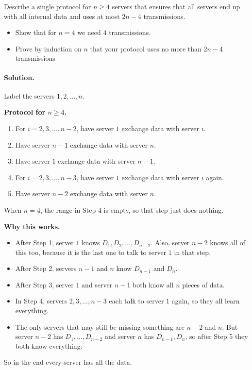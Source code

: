 \documentclass[10pt]{article}
\begin{document}
Describe a single protocol for $n\geq 4$ servers that ensures that all servers end up with all internal data and uses at most $2n-4$ transmissions.






\begin{itemize}
\item Show that for $n=4$ we need $4$ transmissions. 
\item Prove by induction on $n$ that your protocol uses no more than $2n-4$ transmissions


\end{itemize}

\paragraph{Solution.} Label the servers $1,2,\dots,n$.

\textbf{Protocol for $n\ge 4$.}
\begin{enumerate}
\item For $i=2,3,\dots,n-2$, have server $1$ exchange data with server $i$.
\item Have server $n-1$ exchange data with server $n$.
\item Have server $1$ exchange data with server $n-1$.
\item For $i=2,3,\dots,n-3$, have server $1$ exchange data with server $i$ again.
\item Have server $n-2$ exchange data with server $n$.
\end{enumerate}

When $n=4$, the range in Step 4 is empty, so that step just does nothing.

\textbf{Why this works.}
\begin{itemize}
\item After Step 1, server $1$ knows $D_1,D_2,\dots,D_{n-2}$.  Also, server $n-2$ knows all of this too, because it is the last one to talk to server $1$ in that step.
\item After Step 2, servers $n-1$ and $n$ know $D_{n-1}$ and $D_n$.
\item After Step 3, server $1$ and server $n-1$ both know all $n$ pieces of data.
\item In Step 4, servers $2,3,\dots,n-3$ each talk to server $1$ again, so they all learn everything.
\item The only servers that may still be missing something are $n-2$ and $n$.  But server $n-2$ has $D_1,\dots,D_{n-2}$ and server $n$ has $D_{n-1},D_n$, so after Step 5 they both know everything.
\end{itemize}
So in the end every server has all the data.
\end{document}
